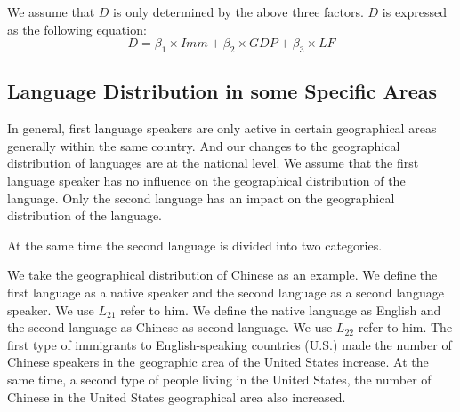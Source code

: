 \documentclass{mcmthesis}
\begin{document}
    We assume that $D$ is only determined by the above three factors.
    $D$ is expressed as the following equation:
    $$D=\beta_1\times Imm+\beta_2\times GDP+\beta_3\times LF$$





    \subsection{Language Distribution in some Specific Areas}%
    In general, first language speakers are only active in certain geographical areas
    generally within the same country.
    And our changes to the geographical distribution of languages are at the national level.
    We assume that the first language speaker has no influence on the geographical distribution of the language.
    Only the second language has an impact on the geographical distribution of the language.

    At the same time the second language is divided into two categories.

    We take the geographical distribution of Chinese as an example.
    We define the first language as a native speaker and the second language as a second language speaker.
    We use $L_{21}$ refer to him.
    We define the native language as English and the second language as Chinese as second language.
    We use $L_{22}$ refer to him.
    The first type of immigrants to English-speaking countries (U.S.) made the number of Chinese speakers in the geographic area of the United States increase.
    At the same time, a second type of people living in the United States, the number of Chinese in the United States geographical area also increased.
\end{document}
